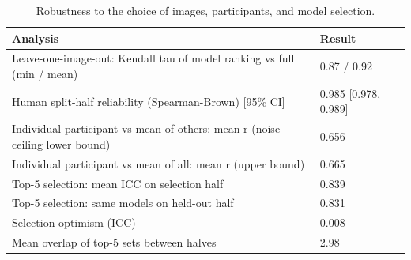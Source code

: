\begin{table}
\caption{Robustness to the choice of images, participants, and model selection.}
\begin{tabular}{ll}
\toprule
Analysis & Result \\
\midrule
Leave-one-image-out: Kendall tau of model ranking vs full (min / mean) & 0.87 / 0.92 \\
Human split-half reliability (Spearman-Brown) [95\% CI] & 0.985 [0.978, 0.989] \\
Individual participant vs mean of others: mean r (noise-ceiling lower bound) & 0.656 \\
Individual participant vs mean of all: mean r (upper bound) & 0.665 \\
Top-5 selection: mean ICC on selection half & 0.839 \\
Top-5 selection: same models on held-out half & 0.831 \\
Selection optimism (ICC) & 0.008 \\
Mean overlap of top-5 sets between halves & 2.98 \\
\bottomrule
\end{tabular}
\end{table}
